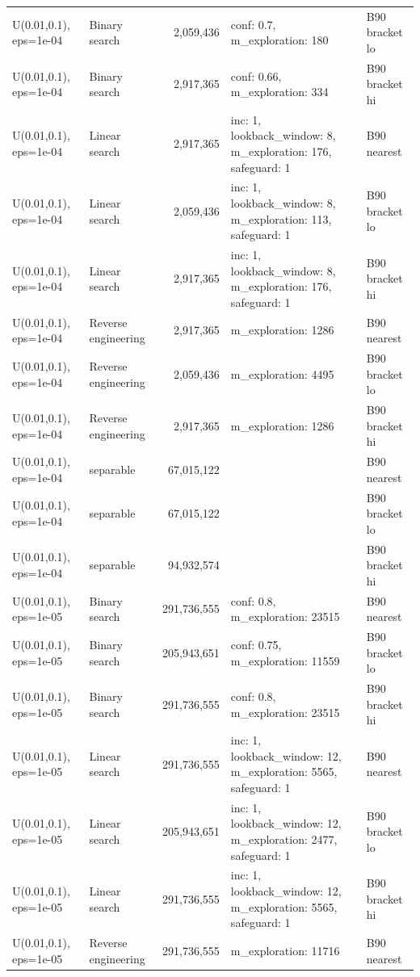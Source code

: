 \begin{tabular}{llrll}
U(0.01,0.1), eps=1e-04 & Binary search & 2,059,436 & conf: 0.7, m\_exploration: 180 & B90 bracket lo \\
U(0.01,0.1), eps=1e-04 & Binary search & 2,917,365 & conf: 0.66, m\_exploration: 334 & B90 bracket hi \\
U(0.01,0.1), eps=1e-04 & Linear search & 2,917,365 & inc: 1, lookback\_window: 8, m\_exploration: 176, safeguard: 1 & B90 nearest \\
U(0.01,0.1), eps=1e-04 & Linear search & 2,059,436 & inc: 1, lookback\_window: 8, m\_exploration: 113, safeguard: 1 & B90 bracket lo \\
U(0.01,0.1), eps=1e-04 & Linear search & 2,917,365 & inc: 1, lookback\_window: 8, m\_exploration: 176, safeguard: 1 & B90 bracket hi \\
U(0.01,0.1), eps=1e-04 & Reverse engineering & 2,917,365 & m\_exploration: 1286 & B90 nearest \\
U(0.01,0.1), eps=1e-04 & Reverse engineering & 2,059,436 & m\_exploration: 4495 & B90 bracket lo \\
U(0.01,0.1), eps=1e-04 & Reverse engineering & 2,917,365 & m\_exploration: 1286 & B90 bracket hi \\
U(0.01,0.1), eps=1e-04 & separable & 67,015,122 &  & B90 nearest \\
U(0.01,0.1), eps=1e-04 & separable & 67,015,122 &  & B90 bracket lo \\
U(0.01,0.1), eps=1e-04 & separable & 94,932,574 &  & B90 bracket hi \\
U(0.01,0.1), eps=1e-05 & Binary search & 291,736,555 & conf: 0.8, m\_exploration: 23515 & B90 nearest \\
U(0.01,0.1), eps=1e-05 & Binary search & 205,943,651 & conf: 0.75, m\_exploration: 11559 & B90 bracket lo \\
U(0.01,0.1), eps=1e-05 & Binary search & 291,736,555 & conf: 0.8, m\_exploration: 23515 & B90 bracket hi \\
U(0.01,0.1), eps=1e-05 & Linear search & 291,736,555 & inc: 1, lookback\_window: 12, m\_exploration: 5565, safeguard: 1 & B90 nearest \\
U(0.01,0.1), eps=1e-05 & Linear search & 205,943,651 & inc: 1, lookback\_window: 12, m\_exploration: 2477, safeguard: 1 & B90 bracket lo \\
U(0.01,0.1), eps=1e-05 & Linear search & 291,736,555 & inc: 1, lookback\_window: 12, m\_exploration: 5565, safeguard: 1 & B90 bracket hi \\
U(0.01,0.1), eps=1e-05 & Reverse engineering & 291,736,555 & m\_exploration: 11716 & B90 nearest \\

\end{tabular}
